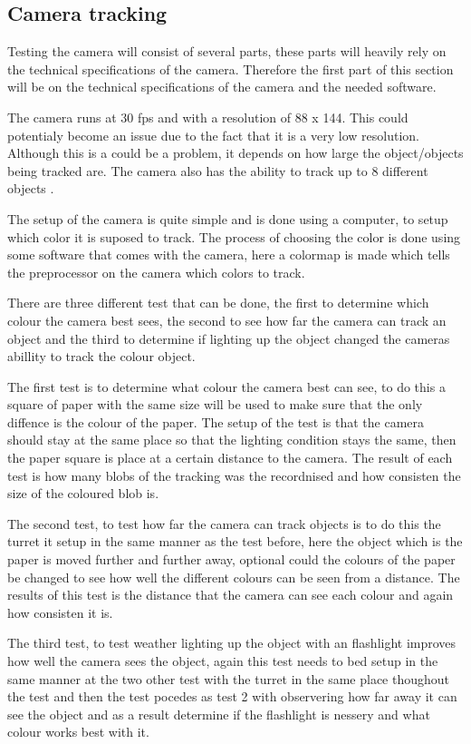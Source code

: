 \subsection{Camera tracking}\label{CamTest}%
Testing the camera will consist of several parts, these parts will heavily rely
on the technical specifications of the camera. Therefore the first part of this
section will be on the technical specifications of the camera and the needed
software.\nl

The camera runs at 30 fps and with a resolution of 88 x 144. This could
potentialy become an issue due to the fact that it is a very low resolution.
Although this is a could be a problem, it depends on how large the
object/objects being tracked are.
The camera also has the ability to track up to 8 different objects
. \nl

The setup of the camera is quite simple and is done using a computer, to setup
which color it is suposed to track. The process of choosing the color is done
using some software that comes with the camera, here a colormap is made which
tells the preprocessor on the camera which colors to track. 

There are three different test that can be done, the first to 
determine which colour the camera best sees, the second to see how
far the camera can track an object and the third to determine if lighting up the
object changed the cameras abillity to track the colour \/ object.\nl

The first test is to determine what colour the camera best can see, to do this
a square of paper with the same size will be used to make sure that the only
diffence is the colour of the paper. The setup of the test is that the camera
should stay at the same place so that the lighting condition stays the same,
then the paper square is place at a certain distance to the camera. The result
of each test is how many blobs of the tracking was the recordnised and how
consisten the size of the coloured blob is.\nl

The second test, to test how far the camera can track objects is to do this the
turret it setup in the same manner as the test before, here the object which is
the paper is moved further and further away, optional could the colours of the
paper be changed to see how well the different colours can be seen from a
distance. The results of this test is the distance that the camera can see each
colour and again how consisten it is.\nl

The third test, to test weather lighting up the object with an flashlight
improves how well the camera sees the object, again this test needs to bed setup
in the same manner at the two other test with the turret in the same place
thoughout the test and then the test pocedes as test 2 with observering how far
away it can see the object and as a result determine if the flashlight is
nessery and what colour works best with it.

